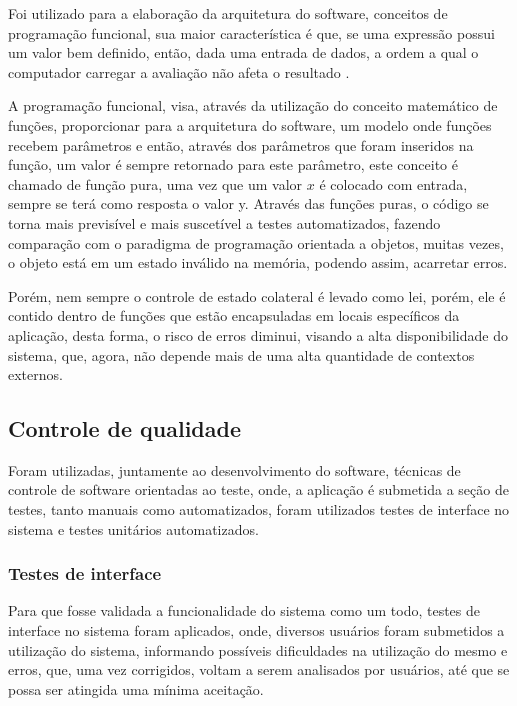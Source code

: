 Foi utilizado para a elaboração da arquitetura do software, conceitos de programação funcional, sua maior característica é que, se uma expressão possui um valor bem definido, então, dada uma entrada de dados, a ordem a qual o computador carregar a avaliação não afeta o resultado \cite{introduction_functional}.

A programação funcional, visa, através da utilização do conceito matemático de funções, proporcionar para a arquitetura do software, um modelo onde funções recebem parâmetros e então, através dos parâmetros que foram inseridos na função, um valor é sempre retornado para este parâmetro, este conceito é chamado de função pura, uma vez que um valor $x$ é colocado com entrada, sempre se terá como resposta o valor y. Através das funções puras, o código se torna mais previsível e mais suscetível a testes automatizados, fazendo comparação com o paradigma de programação orientada a objetos, muitas vezes, o objeto está em um estado inválido na memória, podendo assim, acarretar erros.

Porém, nem sempre o controle de estado colateral é levado como lei, porém, ele é contido dentro de funções que estão encapsuladas em locais específicos da aplicação, desta forma, o risco de erros diminui, visando a alta disponibilidade do sistema, que, agora, não depende mais de uma alta quantidade de contextos externos.

\subsection{Controle de qualidade}

Foram utilizadas, juntamente ao desenvolvimento do software, técnicas de controle de software orientadas ao teste, onde, a aplicação é submetida a seção de testes, tanto manuais como automatizados, foram utilizados testes de interface no sistema e testes unitários automatizados.

\subsubsection{Testes de interface}

Para que fosse validada a funcionalidade do sistema como um todo, testes de interface no sistema foram aplicados, onde, diversos usuários foram submetidos a utilização do sistema, informando possíveis dificuldades na utilização do mesmo e erros, que, uma vez corrigidos, voltam a serem analisados por usuários, até que se possa ser atingida uma mínima aceitação.

